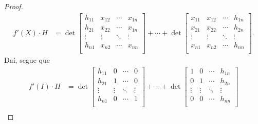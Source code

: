 \documentclass[12pt,a4paper]{article}
\begin{document}
\begin{enumerate}[a)]
\begin{proof}
            \begin{align*}
                f'(X)\cdot H &= 
                \det\begin{bmatrix}
                        h_{11} & x_{12} & \cdots & x_{1n} \\
                        h_{21} & x_{22} & \cdots & x_{1n} \\
                        \vdots & \vdots & \ddots & \vdots \\
                        h_{n1} & x_{n2} & \cdots & x_{nn} \\
                    \end{bmatrix}
                    + \cdots + 
                \det\begin{bmatrix}
                        x_{11} & x_{12} & \cdots & h_{1n} \\
                        x_{21} & x_{22} & \cdots & h_{2n} \\
                        \vdots & \vdots & \ddots & \vdots \\
                        x_{n1} & x_{n2} & \cdots & h_{nn} \\
                    \end{bmatrix}.
            \end{align*}
            Daí, segue que
            \begin{align*}
                f'(I)\cdot H 
                &= 
                \det\begin{bmatrix}
                        h_{11} & 0 & \cdots & 0 \\
                        h_{21} & 1 & \cdots & 0 \\
                        \vdots & \vdots & \ddots & \vdots \\
                        h_{n1} & 0 & \cdots & 1 \\
                    \end{bmatrix}
                    + \cdots + 
                \det\begin{bmatrix}
                        1 & 0 & \cdots & h_{1n} \\
                        0 & 1 & \cdots & h_{2n} \\
                        \vdots & \vdots & \ddots & \vdots \\
                        0 & 0 & \cdots & h_{nn} \\
                    \end{bmatrix} \\

\end{align*}
\end{proof}
\end{enumerate}
\end{document}
